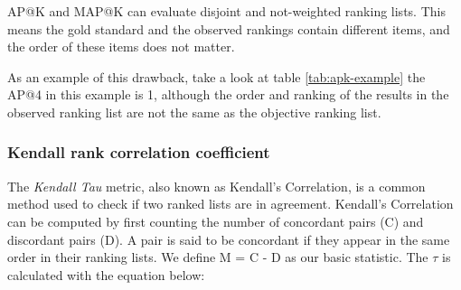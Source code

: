 AP@K and MAP@K can evaluate disjoint and not-weighted ranking lists. This means the gold standard and the observed rankings contain different items, and the order of these items does not matter.

As an example of this drawback, take a look at table \ref{tab:apk-example} the AP@4 in this example is 1, although the order and ranking of the results in the observed ranking list are not the same as the objective ranking list.






\subsubsection{Kendall rank correlation coefficient}
The \emph{Kendall Tau} \cite{kendall1938new} metric, also known as Kendall's Correlation, is a common method used to check if two ranked lists are in agreement. Kendall's Correlation can be computed by first counting the number of concordant pairs (C) and discordant pairs (D). A pair is said to be concordant if they appear in the same order in their ranking lists. We define M = C - D as our basic statistic. The $\tau$ is calculated with the equation below: 

